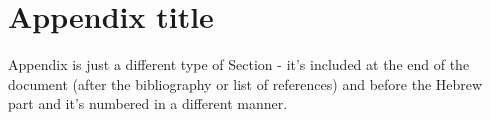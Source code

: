 
\chapter{Appendix title}

Appendix is just a different type of Section - it's included at the
end of the document (after the bibliography or list of references)
and before the Hebrew part and it's numbered in a different manner. 
